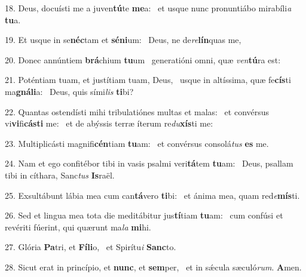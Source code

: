 18. Deus, docuísti me a juven\textbf{tú}te \textbf{me}a: \ast\  et usque nunc pronuntiábo mirabíli\textit{a} \textbf{tu}a.\

19. Et usque in se\textbf{néc}tam et \textbf{sé}\textbf{ni}um: \ast\  Deus, ne de\textit{re}\textbf{lín}quas me,\

20. Donec annúntiem \textbf{brá}chium \textbf{tu}um \ast\  generatióni omni, quæ \textit{ven}\textbf{tú}ra est:\

21. Poténtiam tuam, et justítiam tuam, Deus, \dag\  usque in altíssima, quæ fe\textbf{cís}ti ma\textbf{gná}\textbf{li}a: \ast\  Deus, quis sími\textit{lis} \textbf{ti}bi?\

22. Quantas ostendísti mihi tribulatiónes multas et malas: \dag\  et convérsus vi\textbf{vi}fi\textbf{cás}\textbf{ti} me: \ast\  et de abýssis terræ íterum re\textit{du}\textbf{xís}ti me:\

23. Multiplicásti magnifi\textbf{cén}tiam \textbf{tu}am: \ast\  et convérsus consolá\textit{tus} \textbf{es} me.\

24. Nam et ego confitébor tibi in vasis psalmi veri\textbf{tá}tem \textbf{tu}am: \ast\  Deus, psallam tibi in cíthara, Sanc\textit{tus} \textbf{Is}raël.\

25. Exsultábunt lábia mea cum can\textbf{tá}vero \textbf{ti}bi: \ast\  et ánima mea, quam red\textit{e}\textbf{mís}ti.\

26. Sed et lingua mea tota die meditábitur jus\textbf{tí}tiam \textbf{tu}am: \ast\  cum confúsi et revériti fúerint, qui quærunt ma\textit{la} \textbf{mi}hi.\

27. Glória \textbf{Pa}tri, et \textbf{Fí}\textbf{li}o, \ast\  et Spirítu\textit{i} \textbf{Sanc}to.\

28. Sicut erat in princípio, et \textbf{nunc}, et \textbf{sem}per, \ast\  et in sǽcula sæculó\textit{rum}. \textbf{A}men.\

